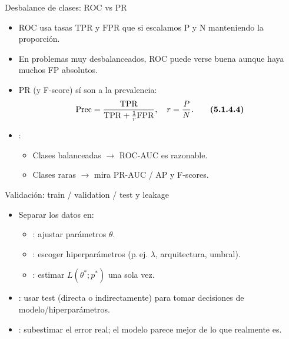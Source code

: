 \begin{frame}{Desbalance de clases: ROC vs PR}
\small
\begin{itemize}
  \item ROC usa tasas \(\mathrm{TPR}\) y \(\mathrm{FPR}\) que  si escalamos P y N manteniendo la proporción. \hfill {}
  \item En problemas muy desbalanceados, ROC puede verse buena aunque haya muchos FP absolutos.
  \item PR (y F-score) sí son  a la prevalencia:
  \[
    \mathrm{Prec} = \frac{\mathrm{TPR}}{\mathrm{TPR} + \frac{1}{r}\mathrm{FPR}},\quad
    r=\frac{P}{N}. \qquad \textbf{(5.1.4.4)}
  \]
  \item {}:
  \begin{itemize}
    \item Clases balanceadas \(\rightarrow\) ROC-AUC es razonable.
    \item Clases raras \(\rightarrow\) mira PR-AUC / AP y F-scores.
  \end{itemize}
\end{itemize}
\end{frame}

\begin{frame}{Validación: train / validation / test y leakage}
\small
\begin{itemize}
  \item Separar los datos en:
  \begin{itemize}
    \item {}: ajustar parámetros \(\theta\).
    \item {}: escoger hiperparámetros (p.\,ej. \(\lambda\), arquitectura, umbral).
    \item {}: estimar \(L(\theta^*;p^*)\) una sola vez. \hfill {}
  \end{itemize}
  \item {}: usar test (directa o indirectamente) para tomar decisiones de modelo/hiperparámetros.
  \item {}: subestimar el error real; el modelo parece mejor de lo que realmente es.
\end{itemize}
\end{frame}

